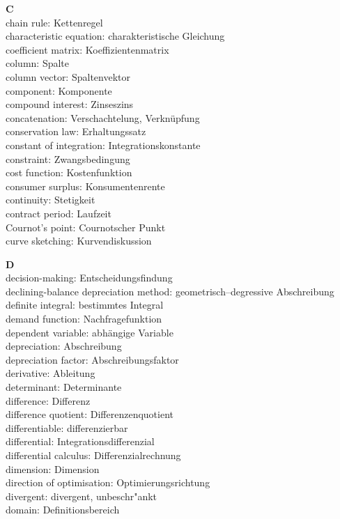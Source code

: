 \medskip
\noindent
{\bf C}\\
chain rule: Kettenregel\\
characteristic equation: charakteristische Gleichung\\
coefficient matrix: Koeffizientenmatrix\\
column: Spalte\\
column vector: Spaltenvektor\\
component: Komponente\\
compound interest: Zinseszins\\
concatenation: Verschachtelung, Verkn\"{u}pfung\\
conservation law: Erhaltungssatz\\
constant of integration: Integrationskonstante\\
constraint: Zwangsbedingung\\
cost function: Kostenfunktion\\
consumer surplus: Konsumentenrente\\
continuity: Stetigkeit\\
contract period: Laufzeit\\
Cournot's point: Cournotscher Punkt\\
curve sketching: Kurvendiskussion

\medskip
\noindent
{\bf D}\\
decision-making: Entscheidungsfindung\\
declining-balance depreciation method: geometrisch--degressive 
Abschreibung\\
definite integral: bestimmtes Integral\\
demand function: Nachfragefunktion\\
dependent variable: abh\"{a}ngige Variable\\
depreciation: Abschreibung\\
depreciation factor: Abschreibungsfaktor\\
derivative: Ableitung\\
determinant: Determinante\\
difference: Differenz\\
difference quotient: Differenzenquotient\\
differentiable: differenzierbar\\
differential: Integrationsdifferenzial\\
differential calculus: Differenzialrechnung\\
dimension: Dimension\\
direction of optimisation: Optimierungsrichtung\\
divergent: divergent, unbeschr"ankt\\
domain: Definitionsbereich

